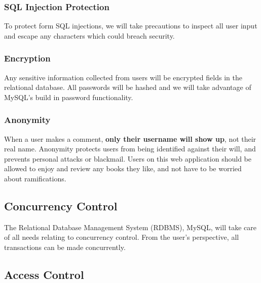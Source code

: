 \documentclass[letter, 12pt, titlepage]{article}
\begin{document}
			\subsubsection{SQL Injection Protection}
				To protect form SQL injections, we will take precautions to inspect all user input and escape any characters which could breach security.

			\subsubsection{Encryption}
				Any sensitive information collected from users will be encrypted fields in the relational database. All passwords will be hashed and we will take advantage of MySQL's build in password functionality.

			\subsubsection{Anonymity}
				When a user makes a comment, \textbf{only their username will show up}, not their real name. Anonymity protects users from being identified against their will, and prevents personal attacks or blackmail. Users on this web application should be allowed to enjoy and review any books they like, and not have to be worried about ramifications.
		
		\subsection{Concurrency Control}
			The Relational Database Management System (RDBMS), MySQL, will take care of all needs relating to concurrency control. From the user's perspective, all transactions can be made concurrently. 

		\subsection{Access Control}
\end{document}
